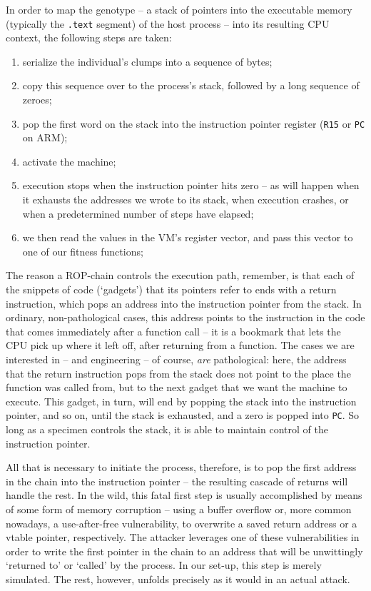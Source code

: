 In order to map the genotype -- a stack of pointers into the executable memory (typically the \texttt{.text} segment) of the host process -- into its resulting CPU context, the following steps are taken:
{\small
\begin{enumerate} 
  \item serialize the individual's clumps into a sequence of bytes;
  \item copy this sequence over to the process's stack, followed by a long sequence of zeroes;
  \item pop the first word on the stack into the instruction pointer register (\texttt{R15} or \texttt{PC} on ARM);
  \item activate the machine;
  \item execution stops when the instruction pointer hits zero -- as will happen when it exhausts the addresses we wrote to its stack, when execution crashes, or when a predetermined number of steps have elapsed;
  \item we then read the values in the VM's register vector, and pass this vector to one of our fitness functions;
\end{enumerate}
}
The reason a ROP-chain controls the execution path,
remember, is that each of the snippets of code (`gadgets') that
its pointers refer to ends with a return instruction, which pops
an address into the instruction pointer from the stack. In ordinary,
non-pathological cases, this address points to the instruction in
the code that comes immediately after a function call -- it is a
bookmark that lets the CPU pick up where it left off,
after returning from a function. The cases we are interested in --
and engineering -- of course, \emph{are} pathological: here, the
address that the return instruction pops from the stack does not
point to the place the function was called from, but to the next
gadget that we want the machine to execute. This gadget, in turn,
will end by popping the stack into the instruction pointer, and so
on, until the stack is exhausted, and a zero is popped into
\texttt{PC}. So long as a specimen controls the stack, it is able
to maintain control of the instruction pointer. 


All that is necessary to initiate the process, therefore, is to
pop the first address in the chain into the instruction pointer --
the resulting cascade of returns will handle the rest. In the
wild, this fatal first step is usually accomplished by means of
some form of memory corruption -- using a buffer overflow or,
more common nowadays, a use-after-free vulnerability, to
overwrite a saved return address or a vtable pointer,
respectively.  The attacker leverages one of these
vulnerabilities in order to write the first pointer in the chain
to an address that will be unwittingly `returned to' or `called'
by the process. In our set-up, this step is merely simulated. The
rest, however, unfolds precisely as it would in an actual
attack.

